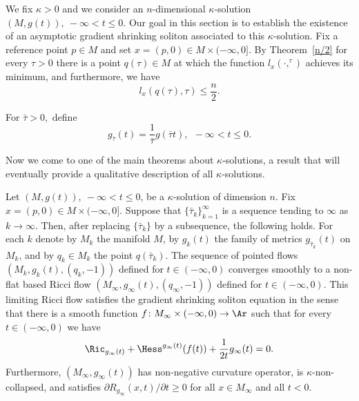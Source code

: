 We fix $\kappa>0$ and we consider an $n$-dimensional
$\kappa$-solution $(M,g(t)),\ -\infty <t\leq 0.$ Our goal in this
section is to establish the existence of an asymptotic gradient
shrinking soliton associated to this $\kappa$-solution. Fix a
reference point $p \in M$ and set $x=(p,0)\in M\times (-\infty,0]$.
By Theorem~\ref{n/2} for every $\tau>0$ there is a point $q(\tau)\in
M$ at which the function $l_x(\cdot,^\tau)$ achieves its minimum,
and furthermore, we have
$$l_x(q(\tau),\tau) \leq \frac{n}{2}.$$

 For $\bar\tau>0,$ define
$$g_{\bar\tau}(t) = \frac{1}{\bar\tau}g(\bar\tau t),\ \  -\infty<t\le 0.$$

Now we come to one of the main theorems about $\kappa$-solutions, a
result that will eventually provide a qualitative description of all
$\kappa$-solutions.

\begin{theorem}\label{thm:asymptotic-gradient-shrinking-soliton}
\label{asympGSS}
Let $(M,g(t)),\ -\infty<t\le 0$,
be a $\kappa$-solution of dimension $n$. Fix $x=(p,0)\in
M\times(-\infty,0]$. Suppose that $\{\bar\tau_{k}\}_{k=1}^\infty $
is a sequence tending to $ \infty$ as $k\rightarrow\infty$. Then,
after replacing $\{\bar\tau_k\}$ by a subsequence, the following
holds. For each $k$ denote by $M_k$ the manifold $M$, by $g_k(t)$
the family of metrics $g_{\bar\tau_k}(t)$ on $M_k$, and by $q_k\in
M_k$ the point $q(\bar\tau_k)$. The sequence of pointed flows
$(M_{k}, g_k(t), (q_{k},-1))$ defined for $t \in (-\infty,0)$
converges smoothly to a non-flat based Ricci flow $(M_{\infty},
g_{\infty}(t), (q_{\infty},-1))$ defined for $t\in (-\infty,0)$.
This limiting Ricci flow  satisfies the gradient shrinking
soliton equation in the sense
that there is a smooth function $f\colon
M_\infty\times(-\infty,0)\to \Ar$ such that for every
$t\in(-\infty,0)$ we have
\begin{equation}\label{GSSequation}
 \Ric_{g_{\infty}(t)} + \Hess^{g_{\infty}(t)}(f(t)) +
\frac{1}{2t}g_{\infty}(t) = 0.
\end{equation}
Furthermore, $(M_\infty,g_\infty(t))$ has non-negative curvature operator, is
$\kappa$-non-collapsed, and satisfies $\partial R_{g_\infty}(x,t)/\partial t\ge
0$ for all $x\in M_\infty$ and all $t<0$.
\end{theorem}

